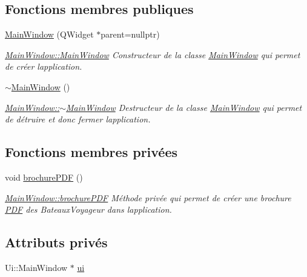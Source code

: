 \subsection*{Fonctions membres publiques}
\begin{DoxyCompactItemize}
\item 
\hyperlink{class_main_window_a996c5a2b6f77944776856f08ec30858d}{Main\+Window} (Q\+Widget $\ast$parent=nullptr)
\begin{DoxyCompactList}\small\item\em \hyperlink{class_main_window_a996c5a2b6f77944776856f08ec30858d}{Main\+Window\+::\+Main\+Window} Constructeur de la classe \hyperlink{class_main_window}{Main\+Window} qui permet de créer l\textquotesingle{}application. \end{DoxyCompactList}\item 
\hyperlink{class_main_window_ae98d00a93bc118200eeef9f9bba1dba7}{$\sim$\+Main\+Window} ()
\begin{DoxyCompactList}\small\item\em \hyperlink{class_main_window_ae98d00a93bc118200eeef9f9bba1dba7}{Main\+Window\+::$\sim$\+Main\+Window} Destructeur de la classe \hyperlink{class_main_window}{Main\+Window} qui permet de détruire et donc fermer l\textquotesingle{}application. \end{DoxyCompactList}\end{DoxyCompactItemize}
\subsection*{Fonctions membres privées}
\begin{DoxyCompactItemize}
\item 
void \hyperlink{class_main_window_a6db0e3a1a7ce60c36d151d1ae618f16c}{brochure\+P\+DF} ()
\begin{DoxyCompactList}\small\item\em \hyperlink{class_main_window_a6db0e3a1a7ce60c36d151d1ae618f16c}{Main\+Window\+::brochure\+P\+DF} Méthode privée qui permet de créer une brochure \hyperlink{class_p_d_f}{P\+DF} des Bateaux\+Voyageur dans l\textquotesingle{}application. \end{DoxyCompactList}\end{DoxyCompactItemize}
\subsection*{Attributs privés}
\begin{DoxyCompactItemize}
\item 
Ui\+::\+Main\+Window $\ast$ \hyperlink{class_main_window_a35466a70ed47252a0191168126a352a5}{ui}
\end{DoxyCompactItemize}


